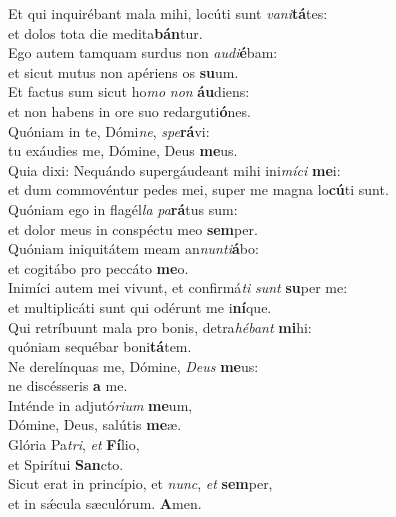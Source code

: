 \oddverse Et qui inquirébant mala mihi, locúti sunt \textit{va}\textit{ni}\textbf{tá}tes:~\*\\
\oddverse et dolos tota die medita\textbf{bán}tur.\\
\evenverse Ego autem tamquam surdus non \textit{au}\textit{di}\textbf{é}bam:~\*\\
\evenverse et sicut mutus non apériens os \textbf{su}um.\\
\oddverse Et factus sum sicut ho\textit{mo} \textit{non} \textbf{áu}diens:~\*\\
\oddverse et non habens in ore suo redarguti\textbf{ó}nes.\\
\evenverse Quóniam in te, Dómi\textit{ne}, \textit{spe}\textbf{rá}vi:~\*\\
\evenverse tu exáudies me, Dómine, Deus \textbf{me}us.\\
\oddverse Quia dixi: Nequándo supergáudeant mihi ini\textit{mí}\textit{ci} \textbf{me}i:~\*\\
\oddverse et dum commovéntur pedes mei, super me magna lo\textbf{cú}ti sunt.\\
\evenverse Quóniam ego in flagél\textit{la} \textit{pa}\textbf{rá}tus sum:~\*\\
\evenverse et dolor meus in conspéctu meo \textbf{sem}per.\\
\oddverse Quóniam iniquitátem meam an\textit{nun}\textit{ti}\textbf{á}bo:~\*\\
\oddverse et cogitábo pro peccáto \textbf{me}o.\\
\evenverse Inimíci autem mei vivunt, et confirmá\textit{ti} \textit{sunt} \textbf{su}per me:~\*\\
\evenverse et multiplicáti sunt qui odérunt me i\textbf{ní}que.\\
\oddverse Qui retríbuunt mala pro bonis, detra\textit{hé}\textit{bant} \textbf{mi}hi:~\*\\
\oddverse quóniam sequébar boni\textbf{tá}tem.\\
\evenverse Ne derelínquas me, Dómine, \textit{De}\textit{us} \textbf{me}us:~\*\\
\evenverse ne discésseris \textbf{a} me.\\
\oddverse Inténde in adjutó\textit{ri}\textit{um} \textbf{me}um,~\*\\
\oddverse Dómine, Deus, salútis \textbf{me}æ.\\
\evenverse Glória Pa\textit{tri}, \textit{et} \textbf{Fí}lio,~\*\\
\evenverse et Spirítui \textbf{San}cto.\\
\oddverse Sicut erat in princípio, et \textit{nunc}, \textit{et} \textbf{sem}per,~\*\\
\oddverse et in sǽcula sæculórum. \textbf{A}men.\\

